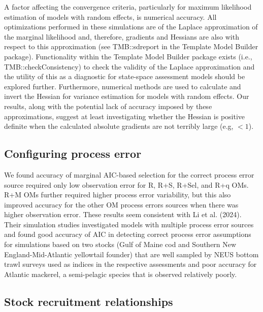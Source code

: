 \documentclass[
  12pt,
]{article}
\begin{document}
A factor affecting the convergence criteria, particularly for maximum
likelihood estimation of models with random effects, is numerical
accuracy. All optimizations performed in these simulations are of the
Laplace approximation of the marginal likelihood and, therefore,
gradients and Hessians are also with respect to this approximation (see
TMB::sdreport in the Template Model Builder package). Functionality
within the Template Model Builder package exists (i.e.,
TMB::checkConsistency) to check the validity of the Laplace
approximation and the utility of this as a diagnostic for state-space
assessment models should be explored further. Furthermore, numerical
methods are used to calculate and invert the Hessian for variance
estimation for models with random effects. Our results, along with the
potential lack of accuracy imposed by these approximations, suggest at
least investigating whether the Hessian is positive definite when the
calculated absolute gradients are not terribly large (e.g, \(< 1\)).

\subsection*{Configuring process error}\label{configuring-process-error}

We found accuracy of marginal AIC-based selection for the correct
process error source required only low observation error for R, R+S,
R+Sel, and R+q OMs. R+M OMs further required higher process error
variability, but this also improved accuracy for the other OM process
errors sources when there was higher observation error. These results
seem consistent with Li et al. (2024). Their simulation studies
investigated models with multiple process error sources and found good
accuracy of AIC in detecting correct process error assumptions for
simulations based on two stocks (Gulf of Maine cod and Southern New
England-Mid-Atlantic yellowtail founder) that are well sampled by NEUS
bottom trawl surveys used as indices in the respective assessments and
poor accuracy for Atlantic mackerel, a semi-pelagic species that is
observed relatively poorly.

\subsection*{Stock recruitment
relationships}\label{stock-recruitment-relationships}
\end{document}

